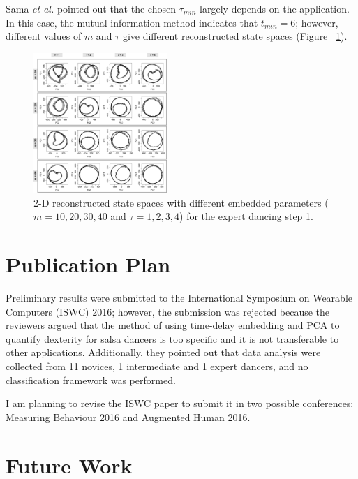 \documentclass[10pt,journal,compsoc]{IEEEtran}
\begin{document}
Sama \textit{et al.} \cite{Sama2013} pointed out that the chosen $\tau_{min}$ largely 
depends on the application. In this case, the mutual information 
method indicates that $t_{min} =  6$; however, different 
values of $m$ and $\tau$ give different reconstructed state spaces 
(Figure ~\ref{fig:takens_problem}).



\begin{figure}[htbp!] 
\centering    
\includegraphics[width=0.45\textwidth]{takens}
\caption[PA]{2-D reconstructed state spaces with different embedded parameters 
($m=10,20,30,40$ and $\tau= 1,2,3,4$) for the expert dancing step 1.}
\label{fig:takens_problem}
\end{figure}








\section{Publication Plan}
Preliminary results were submitted to the International 
Symposium on Wearable Computers (ISWC) 2016; however, 
the submission was rejected because the reviewers argued 
that the method of using time-delay embedding and PCA
to quantify dexterity for salsa dancers is too specific and
it is not transferable to other applications. Additionally, 
they pointed out that data analysis were collected from 
11 novices, 1 intermediate and 1 expert dancers, and no 
classification framework was performed. 

I am planning to revise the ISWC paper to submit it in 
two possible conferences: Measuring Behaviour 2016 and
Augmented Human 2016.




\section{Future Work} 
\end{document}

